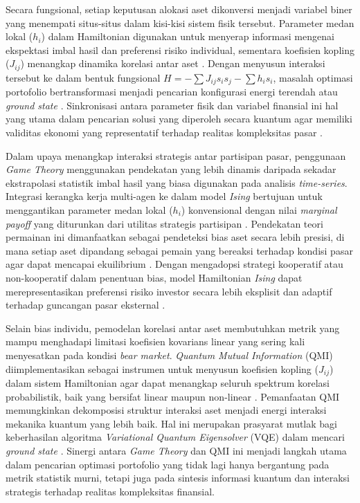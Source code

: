 Secara fungsional, setiap keputusan alokasi aset dikonversi menjadi variabel biner yang menempati situs-situs dalam kisi-kisi sistem fisik tersebut. Parameter medan lokal ($h_i$) dalam Hamiltonian digunakan untuk menyerap informasi mengenai ekspektasi imbal hasil dan preferensi risiko individual, sementara koefisien kopling ($J_{ij}$) menangkap dinamika korelasi antar aset \cite{sikalo_efficient_2022}. Dengan menyusun interaksi tersebut ke dalam bentuk fungsional $H = -\sum J_{ij}s_i s_j - \sum h_i s_i$, masalah optimasi portofolio bertransformasi menjadi pencarian konfigurasi energi terendah atau \textit{ground state} \cite{wei_solving_2025}. Sinkronisasi antara parameter fisik dan variabel finansial ini hal yang utama dalam pencarian solusi yang diperoleh secara kuantum agar memiliki validitas ekonomi yang representatif terhadap realitas kompleksitas pasar \cite{wang_achieving_2025}.

Dalam upaya menangkap interaksi strategis antar partisipan pasar, penggunaan \textit{Game Theory} menggunakan pendekatan yang lebih dinamis daripada sekadar ekstrapolasi statistik imbal hasil yang biasa digunakan pada analisis \textit{time-series}. Integrasi kerangka kerja multi-agen ke dalam model \textit{Ising} bertujuan untuk menggantikan parameter medan lokal ($h_i$) konvensional dengan nilai \textit{marginal payoff} yang diturunkan dari utilitas strategis partisipan \cite{la_torre_multi-agent_2026}. Pendekatan teori permainan ini dimanfaatkan sebagai pendeteksi bias aset secara lebih presisi, di mana setiap aset dipandang sebagai pemain yang bereaksi terhadap kondisi pasar agar dapat mencapai ekuilibrium \cite{sikalo_efficient_2022}. Dengan mengadopsi strategi kooperatif atau non-kooperatif dalam penentuan bias, model Hamiltonian \textit{Ising} dapat merepresentasikan preferensi risiko investor secara lebih eksplisit dan adaptif terhadap guncangan pasar eksternal \cite{wei_solving_2025}.

Selain bias individu, pemodelan korelasi antar aset membutuhkan metrik yang mampu menghadapi limitasi koefisien kovarians linear yang sering kali menyesatkan pada kondisi \textit{bear market}. \textit{Quantum Mutual Information} (QMI) diimplementasikan sebagai instrumen untuk menyusun koefisien kopling ($J_{ij}$) dalam sistem Hamiltonian agar dapat menangkap seluruh spektrum korelasi probabilistik, baik yang bersifat linear maupun non-linear \cite{wang_achieving_2025}. Pemanfaatan QMI memungkinkan dekomposisi struktur interaksi aset menjadi energi interaksi mekanika kuantum yang lebih baik. Hal ini merupakan prasyarat mutlak bagi keberhasilan algoritma \textit{Variational Quantum Eigensolver} (VQE) dalam mencari \textit{ground state} \cite{wei_solving_2025}. Sinergi antara \textit{Game Theory} dan QMI ini menjadi langkah utama dalam pencarian optimasi portofolio yang tidak lagi hanya bergantung pada metrik statistik murni, tetapi juga pada sintesis informasi kuantum dan interaksi strategis terhadap realitas kompleksitas finansial.


